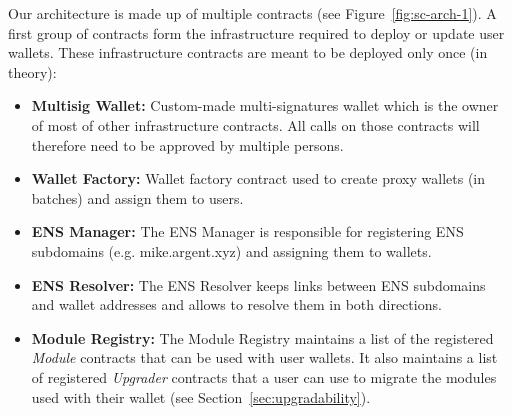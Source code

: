 \documentclass[12pt]{article}
\begin{document}
Our architecture is made up of multiple contracts (see Figure~\ref{fig:sc-arch-1}). A first group of contracts form the infrastructure required to deploy or update user wallets. These infrastructure contracts are meant to be deployed only once (in theory):
\begin{itemize}
    \item \textbf{Multisig Wallet:} Custom-made multi-signatures wallet which is the owner of most of other infrastructure contracts. All calls on those contracts will therefore need to be approved by multiple persons.
    \item \textbf{Wallet Factory:} Wallet factory contract used to create proxy wallets (in batches) and assign them to users.
    \item \textbf{ENS Manager:} The ENS Manager is responsible for registering ENS subdomains (e.g. mike.argent.xyz) and assigning them to wallets.
    \item \textbf{ENS Resolver:} The ENS Resolver keeps links between ENS subdomains and wallet addresses and allows to resolve them in both directions.
    \item \textbf{Module Registry:} The Module Registry maintains a list of the registered \emph{Module} contracts that can be used with user wallets. It also maintains a list of registered \emph{Upgrader} contracts that a user can use to migrate the modules used with their wallet (see Section~\ref{sec:upgradability}).
\end{itemize}
\end{document}
